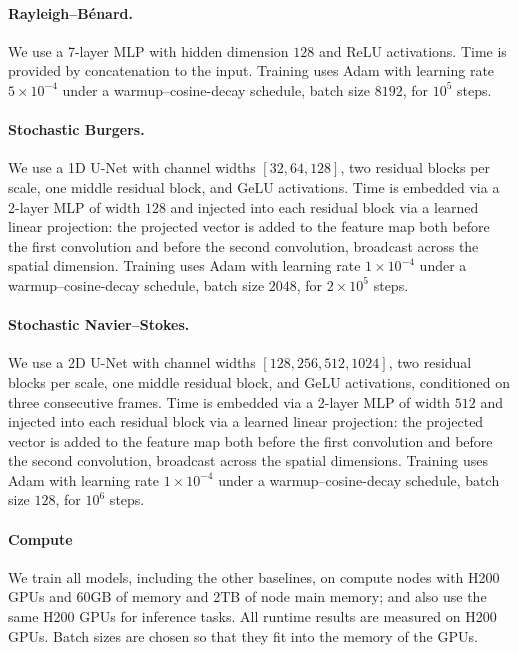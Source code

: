 \documentclass[oneside,11pt]{article}
\theoremstyle{remark}
\begin{document}
\paragraph{Rayleigh--B\'enard.}
We use a 7-layer MLP with hidden dimension $128$ and ReLU activations. Time is provided by concatenation to the input. Training uses Adam with learning rate $5\times10^{-4}$ under a warmup--cosine-decay schedule, batch size $8192$, for $10^5$ steps.

\paragraph{Stochastic Burgers.}
We use a 1D U-Net with channel widths $[32, 64, 128]$, two residual blocks per scale, one middle residual block, and GeLU activations. Time is embedded via a 2-layer MLP of width $128$ and injected into each residual block via a learned linear projection: the projected vector is added to the feature map both before the first convolution and before the second convolution, broadcast across the spatial dimension. Training uses Adam with learning rate $1\times10^{-4}$ under a warmup--cosine-decay schedule, batch size $2048$, for $2\times10^5$ steps.

\paragraph{Stochastic Navier--Stokes.}
We use a 2D U-Net with channel widths $[128, 256, 512, 1024]$, two residual blocks per scale, one middle residual block, and GeLU activations, conditioned on three consecutive frames. Time is embedded via a 2-layer MLP of width $512$ and injected into each residual block via a learned linear projection: the projected vector is added to the feature map both before the first convolution and before the second convolution, broadcast across the spatial dimensions. Training uses Adam with learning rate $1\times10^{-4}$ under a warmup--cosine-decay schedule, batch size $128$, for $10^6$ steps. 




\paragraph{Compute}
We train all models, including the other baselines, on compute nodes with H200 GPUs and 60GB of memory and 2TB of node main memory; and also use the same H200 GPUs for inference tasks. All runtime results are measured on H200 GPUs. Batch sizes are chosen so that they fit into the memory of the GPUs. 
\end{document}
